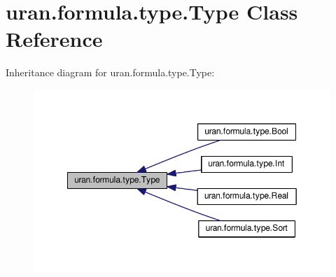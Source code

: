 \hypertarget{classuran_1_1formula_1_1type_1_1_type}{}\section{uran.\+formula.\+type.\+Type Class Reference}
\label{classuran_1_1formula_1_1type_1_1_type}


Inheritance diagram for uran.\+formula.\+type.\+Type\+:
\nopagebreak
\begin{figure}[H]
\begin{center}
\leavevmode
\includegraphics[width=349pt]{classuran_1_1formula_1_1type_1_1_type__inherit__graph}
\end{center}
\end{figure}
